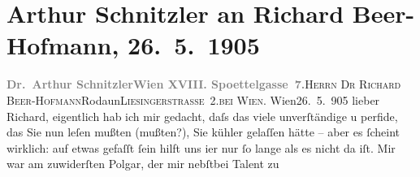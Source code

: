 

         
         \newcommand{\erwaehntePersonen}{Personen: Richard Beer-Hofmann, Paula Beer-Hofmann, Naëmah Beer-Hofmann, Gabriel Beer-Hofmann, Mirjam Beer-Hofmann, Dora Erl, Alfred Polgar, Olga Schnitzler}
         \newcommand{\erwaehnteOrte}{Orte: Edmund-Weiß-Gasse, Liesingerstraße, Rodaun, Wien, XVIII., Währing}
         \newcommand{\erwaehnteWerke}{Werke: Der Graf von Charolais. Ein Trauerspiel}
               \section[Arthur Schnitzler an Richard Beer-Hofmann, 26. 5. 1905]{ Arthur Schnitzler an Richard Beer-Hofmann, 26. 5. 1905}\nopagebreak{}\rehead{ }\begin{ledgroupsized}[t]{13cm}\normalsize\beginnumbering \toendnotes[C]{\smallbreak\pagebreak[2]} 
\toendnotes[C]{\smallbreak}\pstart{}{\pb}\textcolor{gray}{\textbf{Dr. Arthur Schnitzler}}\pend{}\pstart{}\textcolor{gray}{\textbf{Wien XVIII. Spoettelgasse 7.}}\pend{}{\bigskip}\pstart{}{\pb}\textsc{Herrn Dr Richard Beer-Hofmann}\pend{}\pstart{}Rodaun\pend{}\pstart{}\textsc{Liesingerstraße 2}.\pend{}\pstart{}\textsc{bei Wien.}\pend{}{\bigskip}\pstart
           \raggedleft{}{\pb}Wien26. 5. 905\pend
           \pstart
           lieber Richard, eigentlich hab ich mir gedacht, daſs das viele
               unverſtändige u perfide, das Sie nun leſen mußten (mußten?), Sie kühler gelaſſen
               hätte – aber es ſcheint wirklich: auf etwas gefaſſt ſein hilft uns i{\geminationm}er nur ſo lange als es nicht da iſt. Mir war am
               zuwiderſten Polgar, der mir nebſtbei Talent zu

\end{ledgroupsized}
